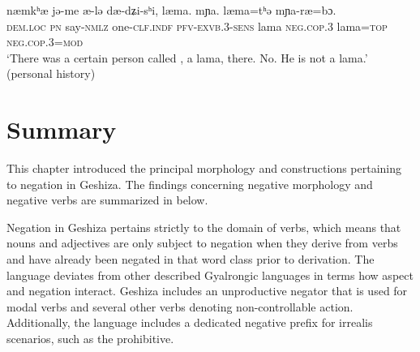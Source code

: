 \documentclass[output=paper,colorlinks,citecolor=brown]{langscibook}
\begin{document}
\ea
\label{disagreement3}
 	{næmkʰæ} 	{jə-me} 		{æ-lə}						{dæ-dʑi-sʰi}, {læma}.		{mɲa}.	{læma=tʰə}		
{mɲa-ræ=bɔ}.\\
\textsc{dem.loc}    \textsc{pn}		say-\textsc{nmlz}	one-\textsc{clf.indf} 	\textsc{pfv-exvb}.3-\textsc{sens} lama \textsc{neg.cop.}3	lama=\textsc{top}		\textsc{neg.cop.3}=\textsc{mod}\\
\glt `There was a certain person called , a lama, there. No. He is not a lama.' (personal history)
\z

\section{Summary}
This chapter introduced the principal morphology and constructions pertaining to negation in Geshiza. The findings concerning negative morphology and negative verbs are summarized in  below. 

\begin{table}
\caption{Negative morphology in Geshiza}
\label{summary}
\end{table}

Negation in Geshiza  pertains strictly to the domain of verbs, which means that nouns and adjectives are only subject to negation when they derive from verbs and have already been negated in that word class prior to derivation. The language deviates from other described Gyalrongic languages in terms how aspect and negation interact. Geshiza includes an unproductive negator  that is used for modal verbs and several other verbs denoting non-controllable action. Additionally, the language includes a dedicated negative prefix  for irrealis scenarios, such as the prohibitive.
\end{document}

